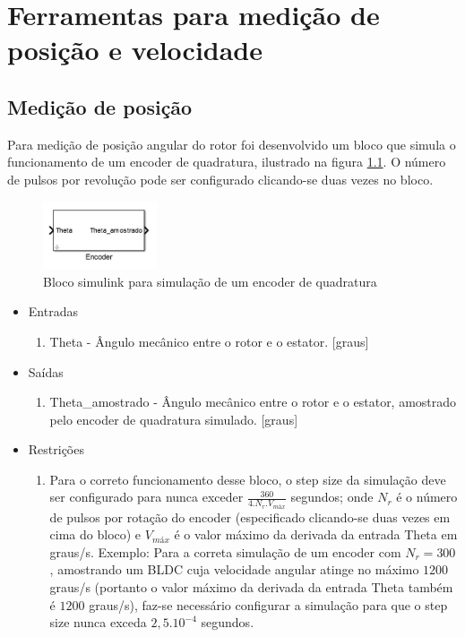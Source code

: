 \chapter{Ferramentas para medição de posição e velocidade}

    \section{Medição de posição}
        Para medição de posição angular do rotor foi desenvolvido um bloco que simula o funcionamento de um encoder de quadratura, ilustrado na figura \ref{fig:bloco_encoder}. O número de pulsos por revolução pode ser configurado clicando-se duas vezes no bloco.
        \begin{figure}[ht]
            \centering
            \includegraphics[width=0.3\textwidth]{bloco_encoder}
            \caption{Bloco simulink para simulação de um encoder de quadratura}
            \label{fig:bloco_encoder}
        \end{figure}

        \begin{itemize}
            \item Entradas
                \begin{enumerate}
                    \item Theta - Ângulo mecânico entre o rotor e o estator. [graus]
                \end{enumerate}
            \item Saídas
                \begin{enumerate}
                    \item Theta\_amostrado - Ângulo mecânico entre o rotor e o estator, amostrado pelo encoder de quadratura simulado. [graus]
                \end{enumerate}
            \item Restrições
                \begin{enumerate}
                    \item Para o correto funcionamento desse bloco, o step size da simulação deve ser configurado para nunca exceder $\frac{360}{4.N_r.V_{máx}}$ segundos; onde $N_r$ é o número de pulsos por rotação do encoder (especificado clicando-se duas vezes em cima do bloco) e $V_{máx}$ é o valor máximo da derivada da entrada Theta em graus/s. Exemplo: Para a correta simulação de um encoder com $N_r=300$, amostrando um BLDC cuja velocidade angular atinge no máximo $1200$ graus/s (portanto o valor máximo da derivada da entrada Theta também é $1200$ graus/s), faz-se necessário configurar a simulação para que o step size nunca exceda $2,5 . 10^{-4}$ segundos.
                \end{enumerate}
        \end{itemize}

